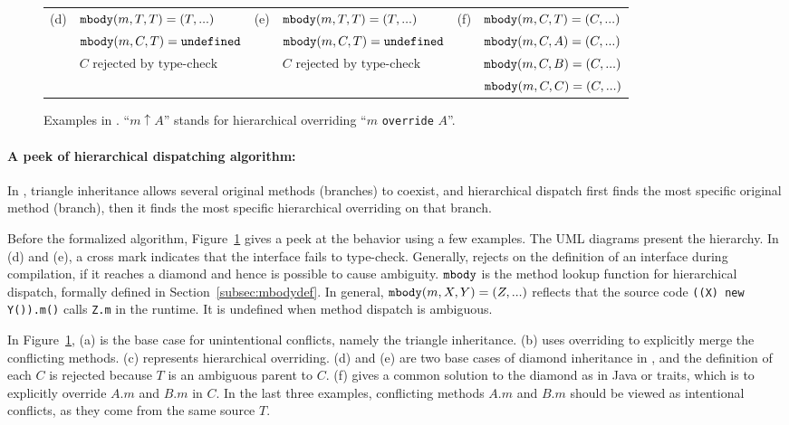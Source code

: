 \begin{figure}[t]
\begin{tabular}{clclcl}
		(d) & $\texttt{mbody}(m,T,T) = (T,...)$\ \ \  & (e) & $\texttt{mbody}(m,T,T) = (T,...)$\ \ \ & (f) & $\texttt{mbody}(m,C,T) = (C,...)$ \\
		& $\texttt{mbody}(m,C,T) = \texttt{undefined}$ & & $\texttt{mbody}(m,C,T) = \texttt{undefined}$ & & $\texttt{mbody}(m,C,A) = (C,...)$ \\
		& $C\text{ rejected by type-check}$ & & $C\text{ rejected by type-check}$ & & $\texttt{mbody}(m,C,B) = (C,...)$ \\
		& & & & & $\texttt{mbody}(m,C,C) = (C,...)$
	\end{tabular}
	\caption{Examples in \MIM{}. ``$m\uparrow A$'' stands for hierarchical overriding ``$m$ \lstinline|override| $A$''.}\label{fig:examplesmbody}
\end{figure}

\paragraph{A peek of hierarchical dispatching algorithm:} In \MIM{}, triangle inheritance allows several original methods (branches)
to coexist, and hierarchical dispatch first finds the most specific
original method (branch), then it finds the most specific hierarchical
overriding on that branch.

Before the formalized algorithm, Figure~\ref{fig:examplesmbody} gives
a peek at the behavior 
using a few examples. The UML diagrams present the hierarchy. 
In (d) and (e), a cross mark indicates that the interface fails to type-check. Generally, \MIM{} rejects on the definition of an interface
during compilation, if it reaches a diamond and hence is possible to cause ambiguity. $\texttt{mbody}$ is the method lookup function for hierarchical
dispatch, formally defined in Section~\ref{subsec:mbodydef}. In general, $\texttt{mbody}(m, X, Y) = (Z, ...)$ reflects that the source code \lstinline|((X) new Y()).m()| calls \lstinline|Z.m| in the runtime. It is undefined when method dispatch is ambiguous.

In  Figure~\ref{fig:examplesmbody}, (a) is the base case for unintentional conflicts, namely the triangle inheritance. (b) uses overriding to explicitly merge the conflicting methods. (c) represents hierarchical overriding. (d) and (e) are two base cases of diamond inheritance in \MIM{}, and the definition of each $C$ is rejected because $T$ is an ambiguous parent to $C$. (f) gives a common solution to the diamond as in Java or traits, which is to explicitly override $A.m$ and $B.m$ in $C$. In the last three examples, conflicting methods $A.m$ and $B.m$ should be viewed as
intentional conflicts, as they come from the same source $T$.
